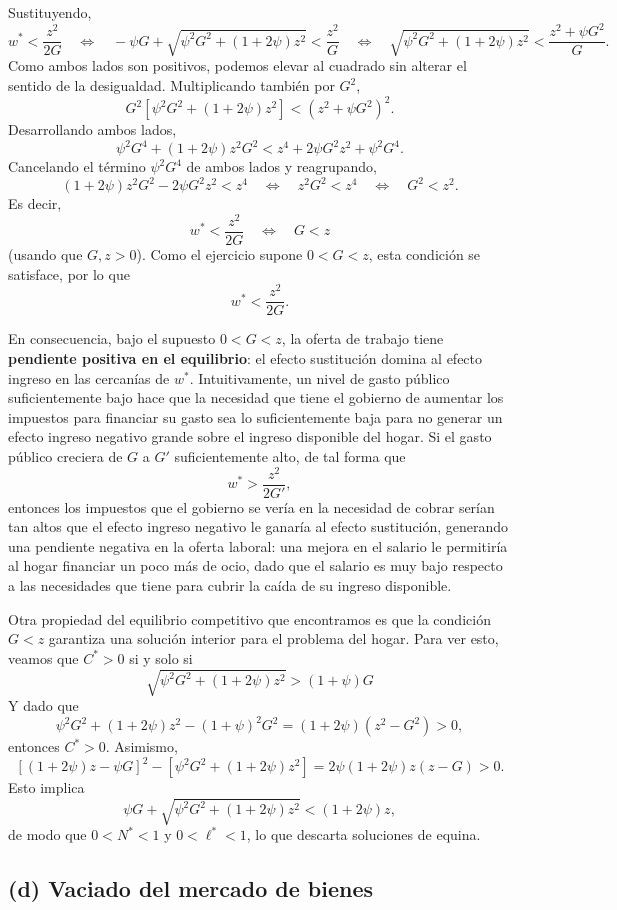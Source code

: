 \documentclass[11pt]{article}
\begin{document}
Sustituyendo,
\[
w^*<\frac{z^2}{2G}
\quad\Longleftrightarrow\quad
-\psi G+\sqrt{\psi^2G^2+(1+2\psi)z^2}<\frac{z^2}{G}
\quad\Longleftrightarrow\quad
\sqrt{\psi^2G^2+(1+2\psi)z^2}<\frac{z^2+\psi G^2}{G}.
\]
Como ambos lados son positivos, podemos elevar al cuadrado sin alterar el sentido de la desigualdad. Multiplicando también por $G^2$,
\[
G^2\left[\psi^2G^2+(1+2\psi)z^2\right]<\left(z^2+\psi G^2\right)^2.
\]
Desarrollando ambos lados,
\[
\psi^2G^4+(1+2\psi)z^2G^2 <
z^4+2\psi G^2z^2+\psi^2G^4.
\]
Cancelando el término $\psi^2G^4$ de ambos lados y reagrupando,
\[
(1+2\psi)z^2G^2-2\psi G^2z^2<z^4
\quad\Longleftrightarrow\quad
z^2G^2<z^4
\quad\Longleftrightarrow\quad
G^2<z^2.
\]
Es decir,
\[
w^*<\frac{z^2}{2G}
\quad\Longleftrightarrow\quad
G<z
\]
(usando que $G,z>0$). Como el ejercicio supone $0<G<z$, esta condición se satisface, por lo que
\[
\boxed{w^*<\frac{z^2}{2G}}.
\]

En consecuencia, bajo el supuesto $0<G<z$, la oferta de trabajo tiene \textbf{pendiente positiva en el equilibrio}: el efecto sustitución domina al efecto ingreso en las cercanías de $w^*$. Intuitivamente, un nivel de gasto público suficientemente bajo hace que la necesidad que tiene el gobierno de aumentar los impuestos para financiar su gasto sea lo suficientemente baja para no generar un efecto ingreso negativo grande sobre el ingreso disponible del hogar. Si el gasto público creciera de $G$ a $G'$ suficientemente alto, de tal forma que
\[
w^*>\frac{z^2}{2G'},
\]
entonces los impuestos que el gobierno se vería en la necesidad de cobrar serían tan altos que el efecto ingreso negativo le ganaría al efecto sustitución, generando una pendiente negativa en la oferta laboral: una mejora en el salario le permitiría al hogar financiar un poco más de ocio, dado que el salario es muy bajo respecto a las necesidades que tiene para cubrir la caída de su ingreso disponible.


Otra propiedad del equilibrio competitivo que encontramos es que la condición $G<z$ garantiza una solución interior para el problema del hogar. 
Para ver esto, veamos que $C^*>0$ si y solo si
\[
  \sqrt{\psi^2G^2+(1+2\psi)z^2}>(1+\psi)G
\]
Y dado que
\[
  \psi^2G^2+(1+2\psi)z^2-(1+\psi)^2G^2
  =(1+2\psi)(z^2-G^2)>0,
\]
entonces $C^*>0$. Asimismo,
\[
  \left[(1+2\psi)z-\psi G\right]^2
  -\left[\psi^2G^2+(1+2\psi)z^2\right]
  =2\psi(1+2\psi)z(z-G)>0.
\]
Esto implica
\[
  \psi G+\sqrt{\psi^2G^2+(1+2\psi)z^2}<(1+2\psi)z,
\]
de modo que $0<N^*<1$ y $0<\ell^*<1$, lo que descarta soluciones de equina.

\subsection*{(d) Vaciado del mercado de bienes}
\end{document}
